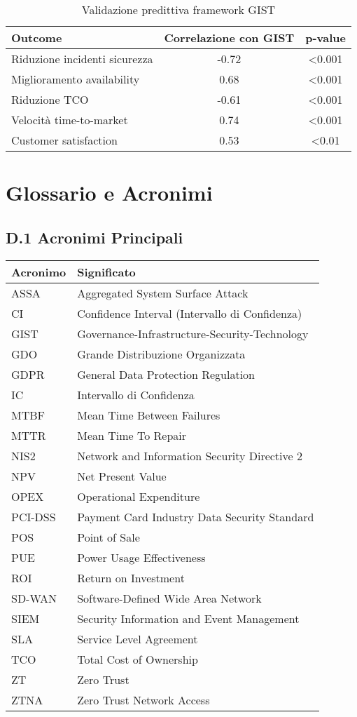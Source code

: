 \begin{table}[htbp]
\centering
\begin{tabular}{lcc}
\toprule
\textbf{Outcome} & \textbf{Correlazione con GIST} & \textbf{p-value} \\
\midrule
Riduzione incidenti sicurezza & -0.72 & <0.001 \\
Miglioramento availability & 0.68 & <0.001 \\
Riduzione TCO & -0.61 & <0.001 \\
Velocità time-to-market & 0.74 & <0.001 \\
Customer satisfaction & 0.53 & <0.01 \\
\bottomrule
\end{tabular}
\caption{Validazione predittiva framework GIST}
\end{table}

\chapter{\texorpdfstring{\textbf{Glossario e Acronimi}}{Appendice D - Glossario e Acronimi}}

\section{\texorpdfstring{\textbf{D.1 Acronimi Principali}}{D.1 - Acronimi Principali}}

\begin{tabular}{ll}
\textbf{Acronimo} & \textbf{Significato} \\
\hline
ASSA & Aggregated System Surface Attack \\
CI & Confidence Interval (Intervallo di Confidenza) \\
GIST & Governance-Infrastructure-Security-Technology \\
GDO & Grande Distribuzione Organizzata \\
GDPR & General Data Protection Regulation \\
IC & Intervallo di Confidenza \\
MTBF & Mean Time Between Failures \\
MTTR & Mean Time To Repair \\
NIS2 & Network and Information Security Directive 2 \\
NPV & Net Present Value \\
OPEX & Operational Expenditure \\
PCI-DSS & Payment Card Industry Data Security Standard \\
POS & Point of Sale \\
PUE & Power Usage Effectiveness \\
ROI & Return on Investment \\
SD-WAN & Software-Defined Wide Area Network \\
SIEM & Security Information and Event Management \\
SLA & Service Level Agreement \\
TCO & Total Cost of Ownership \\
ZT & Zero Trust \\
ZTNA & Zero Trust Network Access \\
\end{tabular}

